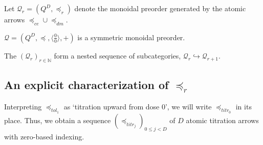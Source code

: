 \documentclass{article}
\newcommand{\N}{\mathbb{N}}
\newcommand{\Q}{\ensuremath{\mathcal{Q}}}
\begin{document}
\begin{defn}\label{lesaf^D}
  Let $\Q_r = (Q^D,\preceq_r)$ denote the monoidal preorder generated by the atomic arrows $\preceq_{ce} \cup \preceq_{dm}$.
\end{defn}

\begin{fact}\label{symon}
  $\Q = (Q^D,\preceq,\langle\frac{0}{0}\rangle,+)$ is a symmetric monoidal preorder.
\end{fact}

\begin{fact}
  The $(\Q_r)_{r\in\N}$ form a nested sequence of subcategories, $\Q_r \hookrightarrow \Q_{r+1}.$
\end{fact}

\subsection{An explicit characterization of $\preceq_r$}

\begin{nota}\label{titr0}
  Interpreting $\preceq_{tol_1}$ as `titration upward from dose 0', we will write $\preceq_{titr_0}$ in its place.  Thus, we obtain a sequence $(\preceq_{titr_j})_{0\le j<D}$ of $D$ atomic titration arrows with zero-based indexing.
\end{nota}
\end{document}

